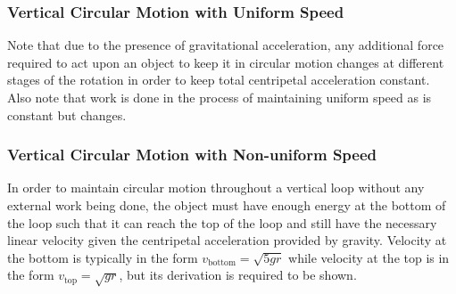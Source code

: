 \documentclass[../main]{subfiles}
\begin{document}
	\subsubsection{Vertical Circular Motion with Uniform Speed}

	Note that due to the presence of gravitational acceleration, any additional force required to act upon an object to keep it in circular motion changes at different stages of the rotation in order to keep total centripetal acceleration constant. \\

	Also note that work is done in the process of maintaining uniform speed as  is constant but  changes.

	\subsubsection{Vertical Circular Motion with Non-uniform Speed}

	In order to maintain circular motion throughout a vertical loop without any external work being done, the object must have enough energy at the bottom of the loop such that it can reach the top of the loop and still have the necessary linear velocity given the centripetal acceleration provided by gravity. Velocity at the bottom is typically in the form \(v_\text{bottom} = \sqrt{5gr}\) while velocity at the top is in the form \(v_\text{top} = \sqrt{gr}\), but its derivation is required to be shown. \\
\end{document}
